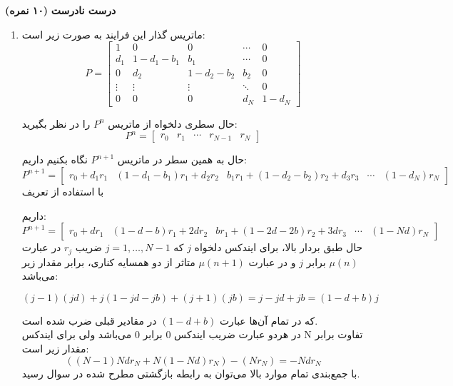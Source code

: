 \Large \textbf{درست نادرست}
\large \textbf{(۱۰ نمره)}

\normalsize \vspace{0.5cm}

\begin{enumerate}[label=(\alph*)]
	\item
	ماتریس گذار این فرایند به صورت زیر است:
	$$
	P = \left[ {\begin{array}{*{20}{c}}
			1&0&0& \cdots &0\\
			{{d_1}}&{1 - {d_1} - {b_1}}&{{b_1}}& \cdots &0\\
			0&{{d_2}}&{1 - {d_2} - {b_2}}&{{b_2}}&0\\
			\vdots & \vdots & \vdots & \ddots &0\\
			0&0&0&{{d_N}}&{1 - {d_N}}
	\end{array}} \right]
	$$
	
	حال سطری دلخواه از ماتریس
	${P^n}$
	را در نظر بگیرید:
	$$
	{P^n} = \left[ {\begin{array}{*{20}{c}}
			{{r_0}}&{{r_1}}& \cdots &{{r_{N - 1}}}&{{r_N}}
	\end{array}} \right]
	$$
	
	حال به همین سطر در ماتریس
	${P^{n + 1}}$
	نگاه بکنیم داریم:
	$$
	{P^{n + 1}} = \left[ {\begin{array}{*{20}{c}}
			{{r_0} + {d_1}{r_1}}&{\left( {1 - {d_1} - {b_1}} \right){r_1} + {d_2}{r_2}}&{{b_1}{r_1} + \left( {1 - {d_2} - {b_2}} \right){r_2} + {d_3}{r_3}}& \cdots &{\left( {1 - {d_N}} \right){r_N}}
	\end{array}} \right]
	$$
	با استفاده از تعریف
	
	داریم:
	$$
	{P^{n + 1}} = \left[ {\begin{array}{*{20}{c}}
			{{r_0} + d{r_1}}&{\left( {1 - d - b} \right){r_1} + 2d{r_2}}&{b{r_1} + \left( {1 - 2d - 2b} \right){r_2} + 3d{r_3}}& \cdots &{\left( {1 - Nd} \right){r_N}}
	\end{array}} \right]
	$$
	حال طبق بردار بالا،‌ برای ایندکس دلخواه
	$j$
	که
	$j = 1, \ldots ,N - 1$
	ضریب
	${r_j}$
	در عبارت
	$\mu \left( n \right)$
	برابر $j$ و در عبارت
	$\mu \left( {n + 1} \right)$
	متاثر از دو همسایه کناری، برابر مقدار زیر می‌باشد:
	
	$$
	\left( {j - 1} \right)\left( {jd} \right) + j\left( {1 - jd - jb} \right) + \left( {j + 1} \right)\left( {jb} \right) = j - jd + jb = \left( {1 - d + b} \right)j
	$$
	
	که در تمام آن‌ها عبارت
	$\left( {1 - d + b} \right)$
	در مقادیر قبلی ضرب شده است.\\
	
	در هردو عبارت ضریب ایندکس 0 برابر 0 می‌باشد ولی برای ایندکس N تفاوت برابر مقدار زیر است:
	$$
	\left( {\left( {N - 1} \right)Nd{r_N} + N\left( {1 - Nd} \right){r_N}} \right) - \left( {N{r_N}} \right) =  - Nd{r_N}
	$$
	با جمع‌بندی تمام موارد بالا می‌توان به رابطه بازگشتی مطرح شده در سوال رسید.
\end{enumerate}
